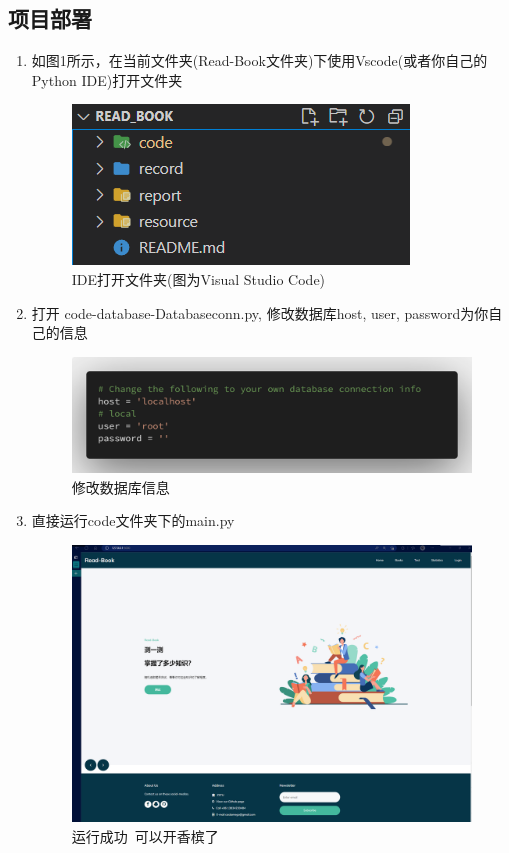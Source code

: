 \documentclass[twoside,11pt]{article}
\begin{document}
\subsection{项目部署}
\begin{enumerate}
    \item 如图1所示，在当前文件夹(Read-Book文件夹)下使用Vscode(或者你自己的Python IDE)打开文件夹

          \begin{figure}[H]
              \centering
              \includegraphics[width=0.35\columnwidth]{figures/fileopen.png}
              \caption{IDE打开文件夹(图为Visual Studio Code)}
          \end{figure}
    \item 打开 code-database-Databaseconn.py, 修改数据库host, user, password为你自己的信息

          \begin{figure}[H]
              \centering
              \includegraphics[width=0.9\columnwidth]{figures/sql.png}
              \caption{修改数据库信息}
          \end{figure}
    \item 直接运行code文件夹下的main.py
          \begin{figure}[H]
              \centering
              \includegraphics[width=1\columnwidth]{figures/demo.png}
              \caption{运行成功~可以开香槟了}
          \end{figure}
\end{enumerate}
\end{document}
